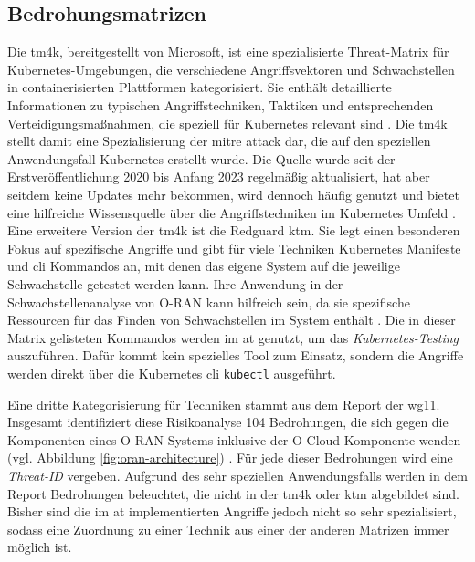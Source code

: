 \subsection{Bedrohungsmatrizen}
\par Die \gls{tm4k}, bereitgestellt von Microsoft, ist eine spezialisierte Threat-Matrix für Kubernetes-Umgebungen, die verschiedene Angriffsvektoren und Schwachstellen in containerisierten Plattformen kategorisiert. Sie enthält detaillierte Informationen zu typischen Angriffstechniken, Taktiken und entsprechenden Verteidigungsmaßnahmen, die speziell für Kubernetes relevant sind \autocite{TacticsThreatMatrix}. Die \gls{tm4k} stellt damit eine Spezialisierung der \gls{mitre} \gls{attack} dar, die auf den speziellen Anwendungsfall Kubernetes erstellt wurde. Die Quelle wurde seit der Erstveröffentlichung 2020 bis Anfang 2023 regelmäßig aktualisiert, hat aber seitdem keine Updates mehr bekommen, wird dennoch häufig genutzt und bietet eine hilfreiche Wissensquelle über die Angriffstechniken im Kubernetes Umfeld \autocite{DeploymentsMicrosoftThreatMatrixforKubernetes}. Eine erweitere Version der \gls{tm4k} ist die Redguard \gls{ktm}. Sie legt einen besonderen Fokus auf spezifische Angriffe und gibt für viele Techniken Kubernetes Manifeste und \gls{cli} Kommandos an, mit denen das eigene System auf die jeweilige Schwachstelle getestet werden kann. Ihre Anwendung in der Schwachstellenanalyse von O-RAN kann hilfreich sein, da sie spezifische Ressourcen für das Finden von Schwachstellen im System enthält \autocite{KubernetesThreatMatrix}. Die in dieser Matrix gelisteten Kommandos werden im \gls{at} genutzt, um das \textit{Kubernetes-Testing} auszuführen. Dafür kommt kein spezielles Tool zum Einsatz, sondern die Angriffe werden direkt über die Kubernetes \gls{cli} \verb|kubectl| ausgeführt.
\par Eine dritte Kategorisierung für Techniken stammt aus dem Report der \orana{} \gls{wg11}. Insgesamt identifiziert diese Risikoanalyse 104 Bedrohungen, die sich gegen die Komponenten eines O-RAN Systems inklusive der O-Cloud Komponente wenden (vgl. Abbildung \ref{fig:oran-architecture}) \autocite{o-ranworkgroup11securityworkgroupORANSecurityThreat2024}. Für jede dieser Bedrohungen wird eine \textit{Threat-ID} vergeben. Aufgrund des sehr speziellen Anwendungsfalls werden in dem Report Bedrohungen beleuchtet, die nicht in der \gls{tm4k} oder \gls{ktm} abgebildet sind. Bisher sind die im \gls{at} implementierten Angriffe jedoch nicht so sehr spezialisiert, sodass eine Zuordnung zu einer Technik aus einer der anderen Matrizen immer möglich ist.
